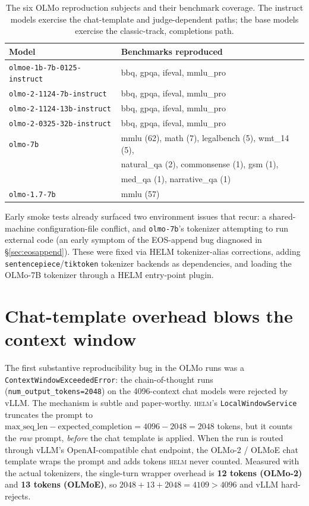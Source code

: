 \documentclass[11pt]{report}
\newcommand{\code}[1]{\texttt{#1}}
\begin{document}
\begin{table}[H]
\centering
\small
\begin{tabularx}{\textwidth}{lY}
\toprule
\textbf{Model} & \textbf{Benchmarks reproduced} \\
\midrule
\code{olmoe-1b-7b-0125-instruct}   & bbq, gpqa, ifeval, mmlu\_pro \\
\code{olmo-2-1124-7b-instruct}     & bbq, gpqa, ifeval, mmlu\_pro \\
\code{olmo-2-1124-13b-instruct}    & bbq, gpqa, ifeval, mmlu\_pro \\
\code{olmo-2-0325-32b-instruct}    & bbq, gpqa, ifeval, mmlu\_pro \\
\code{olmo-7b}                     & mmlu (62), math (7), legalbench (5), wmt\_14 (5), \\
                                   & natural\_qa (2), commonsense (1), gsm (1), \\
                                   & med\_qa (1), narrative\_qa (1) \\
\code{olmo-1.7-7b}                 & mmlu (57) \\
\bottomrule
\end{tabularx}
\caption{The six OLMo reproduction subjects and their benchmark coverage. The
instruct models exercise the chat-template and judge-dependent paths; the base
models exercise the classic-track, completions path.}
\label{tab:olmogrid}
\end{table}

Early smoke tests already surfaced two environment issues that recur:
a shared-machine configuration-file conflict, and \code{olmo-7b}'s tokenizer
attempting to run external code (an early symptom of the EOS-append bug diagnosed
in \S\ref{sec:eosappend}). These were fixed via HELM tokenizer-alias corrections,
adding \code{sentencepiece}/\code{tiktoken} tokenizer backends as dependencies, and
loading the OLMo-7B tokenizer through a HELM entry-point plugin.

\section{Chat-template overhead blows the context window}

The first substantive reproducibility bug in the OLMo runs was a
\code{ContextWindowExceededError}: the chain-of-thought runs
(\code{num\_output\_tokens=2048}) on the 4096-context chat models were rejected by
vLLM. The mechanism is subtle and paper-worthy. \textsc{helm}'s
\code{LocalWindowService} truncates the prompt to
$\text{max\_seq\_len} - \text{expected\_completion} = 4096 - 2048 = 2048$ tokens,
but it counts the \emph{raw} prompt, \emph{before} the chat template is applied.
When the run is routed through vLLM's OpenAI-compatible chat endpoint, the OLMo-2 /
OLMoE chat template wraps the prompt and adds tokens \textsc{helm} never counted.
Measured with the actual tokenizers, the single-turn wrapper overhead is
\textbf{12 tokens (OLMo-2)} and \textbf{13 tokens (OLMoE)}, so
$2048 + 13 + 2048 = 4109 > 4096$ and vLLM hard-rejects.
\end{document}
